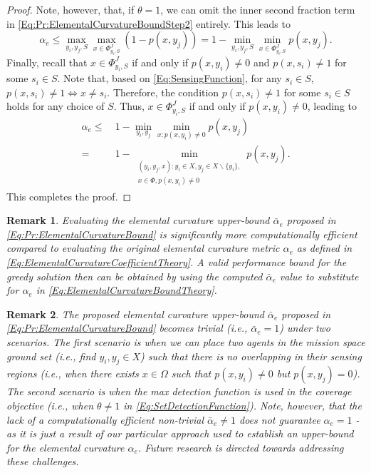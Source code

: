 \documentclass[letterpaper, 10 pt, conference]{ieeeconf}
\newtheorem{remark}{Remark}
\begin{document}
\begin{proof}
Note, however, that, if $\theta = 1$, we can omit the inner second fraction term in \eqref{Eq:Pr:ElementalCurvatureBoundStep2} entirely. This leads to 
\begin{equation*}
\alpha_e \leq 
\max_{y_i,y_j,S} \max_{x\in \Phi_{y_i,S}^J} (1-p(x,y_j)) 
= 1-\min_{y_i,y_j,S} \min_{x\in \Phi_{y_i,S}^J} p(x,y_j).
\end{equation*}
Finally, recall that $x\in\Phi_{y_i,S}^J$ if and only if $p(x,y_i) \neq 0$ and $p(x,s_i) \neq 1$ for some $s_i\in S$. Note that, based on \eqref{Eq:SensingFunction}, for any $s_i\in S$, $p(x,s_i) \neq 1 \iff x\neq s_i$. Therefore, the condition $p(x,s_i) \neq 1$ for some $s_i\in S$ holds for any choice of $S$. Thus, $x\in\Phi_{y_i,S}^J$ if and only if $p(x,y_i) \neq 0$, leading to    
\begin{align*}
\alpha_e \leq&\  
1-\min_{y_i,y_j} \min_{x: p(x,y_i) \neq 0} p(x,y_j)\\
=&\ 1-\min_{\substack{(y_i,y_j,x):y_i\in X, y_j \in X\backslash\{y_i\},\\ 
x\in \Phi, p(x,y_i) \neq 0}} p(x,y_j).
\end{align*}
This completes the proof.
\end{proof}

\begin{remark}
Evaluating the elemental curvature upper-bound $\bar{\alpha}_e$ proposed in \eqref{Eq:Pr:ElementalCurvatureBound} is significantly more computationally efficient compared to evaluating the original elemental curvature metric $\alpha_e$ as defined in \eqref{Eq:ElementalCurvatureCoefficientTheory}. 
A valid performance bound for the greedy solution then can be obtained by using the computed $\bar{\alpha}_e$ value to substitute for $\alpha_e$ in \eqref{Eq:ElementalCurvatureBoundTheory}. 
\end{remark}

\begin{remark}\label{Rm:ElementalCurvatureBoundTriviality}
The proposed elemental curvature upper-bound $\bar{\alpha}_e$ proposed in \eqref{Eq:Pr:ElementalCurvatureBound} becomes trivial (i.e., $\bar{\alpha}_e=1$) under two scenarios. The first scenario is when we can place two agents in the mission space ground set (i.e., find $y_i,y_j\in X$) such that there is no overlapping in their sensing regions (i.e., when there exists $x\in \Omega$ such that $p(x,y_i)\neq 0$ but $p(x,y_j)=0$). The second scenario is when the max detection function is used in the coverage objective (i.e., when $\theta \neq 1$ in \eqref{Eq:SetDetectionFunction}). Note, however, that the lack of a computationally efficient non-trivial $\bar{\alpha}_e \neq 1$ does not guarantee $\alpha_e = 1$ - as it is just a result of our particular approach used to establish an upper-bound for the elemental curvature $\alpha_e$. Future research is directed towards addressing these challenges.
\end{remark}
\end{document}
